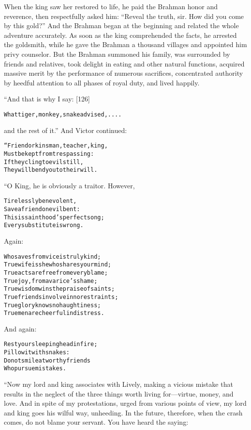 \documentclass{article}
\renewenvironment{verbatim}{\begin{alltt}\normalfont\begin{centering}}{\end{centering}\end{alltt}}
\begin{document}
When the king saw her restored to life, he paid the Brahman honor
and reverence, then respectfully asked him:
``Reveal the truth, sir. How did you come by this gold?'' And the
Brahman began at the beginning and related the whole adventure
accurately. As soon as the king comprehended the facts, he arrested
the goldsmith, while he gave the Brahman a thousand villages and
appointed him privy counselor. But the Brahman summoned his family,
was surrounded by friends and relatives, took delight in eating and
other natural functions, acquired massive merit by the performance
of numerous sacrifices, concentrated authority by heedful attention
to all phases of royal duty, and lived happily.

“And that is why I say: [126]

\begin{verbatim}
What tiger, monkey, snake advised, ....
\end{verbatim}
and the rest of it.” And Victor continued:

\begin{verbatim}
“Friend or kinsman, teacher, king,
Must be kept from trespassing:
If they cling to evil still,
They will bend you to their will.
\end{verbatim}
“O King, he is obviously a traitor. However,

\begin{verbatim}
Tirelessly benevolent,
Save a friend on evil bent:
This is sainthood's perfect song;
Every substitute is wrong.
\end{verbatim}
Again:

\begin{verbatim}
Who saves from vice is truly kind;
True wife is she who shares your mind;
True acts are free from every blame;
True joy, from avarice's shame;
True wisdom wins the praise of saints;
True friends involve in no restraints;
True glory knows no haughtiness;
True men are cheerful in distress.
\end{verbatim}
And again:

\begin{verbatim}
Rest your sleeping head in fire;
Pillow it with snakes:
Do not smile at worthy friends
Who pursue mistakes.
\end{verbatim}
“Now my lord and king associates with Lively, making a vicious
mistake that results in the neglect of the three things worth
living for---virtue, money, and love. And in spite of my
protestations, urged from various points of view, my lord and king
goes his wilful way, unheeding. In the future, therefore, when the
crash comes, do not blame your servant. You have heard the saying:
\end{document}
